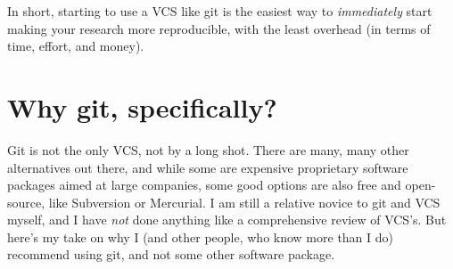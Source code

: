 \documentclass{article}
\begin{document}
In short, starting to use a VCS like git is the easiest way to \emph{immediately} start making your research more reproducible, with the least overhead (in terms of time, effort, and money).
\section{Why git, specifically?}
\label{sec-4}

Git is not the only VCS, not by a long shot.  There are many, many other alternatives out there, and while some are expensive proprietary software packages aimed at large companies, some good options are also free and open-source, like Subversion or Mercurial.  I am still a relative novice to git and VCS myself, and I have \emph{not} done anything like a comprehensive review of VCS's.  But here's my take on why I (and other people, who know more than I do) recommend using git, and not some other software package.
\end{document}
